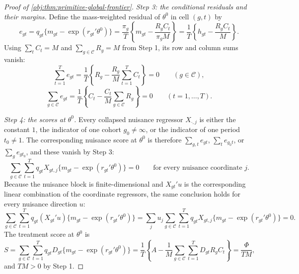 \documentclass[11pt]{article}
\begin{document}
\begin{proof}[Proof of \cref{obj:thm:primitive-global-frontier}]
\textit{Step 3: the conditional residuals and their margins.} Define the mass-weighted residual of \(\theta^0\) in cell \((g,t)\) by
\[
e_{gt}
=q_{gt}\{m_{gt}-\exp(r_{gt}'\theta^0)\}
=\frac{\pi_g}{T}\left\{m_{gt}-\frac{R_gC_t}{\pi_gM}\right\}
=\frac{1}{T}\left\{h_{gt}-\frac{R_gC_t}{M}\right\}.
\]
Using \(\sum_tC_t=M\) and \(\sum_{g\in\mathcal C}R_g=M\) from Step 1, its row and column sums vanish:
\[
\sum_{t=1}^T e_{gt}=\frac{1}{T}\left\{R_g-\frac{R_g}{M}\sum_{t=1}^TC_t\right\}=0
\qquad(g\in\mathcal C),
\]
\[
\sum_{g\in\mathcal C} e_{gt}=\frac{1}{T}\left\{C_t-\frac{C_t}{M}\sum_{g\in\mathcal C}R_g\right\}=0
\qquad(t=1,\ldots,T).
\]

\textit{Step 4: the scores at \(\theta^0\).} Every collapsed nuisance regressor \(X_{\cdot,j}\) is either the constant \(1\), the indicator of one cohort \(g_0\neq\infty\), or the indicator of one period \(t_0\neq1\). The corresponding nuisance score at \(\theta^0\) is therefore \(\sum_{g,t}e_{gt}\), \(\sum_te_{g_0t}\), or \(\sum_ge_{gt_0}\), and these vanish by Step 3:
\[
\sum_{g\in\mathcal C}\sum_{t=1}^T
q_{gt}X_{gt,j}\{m_{gt}-\exp(r_{gt}'\theta^0)\}=0
\qquad\text{for every nuisance coordinate }j .
\]
Because the nuisance block is finite-dimensional and \(X_{gt}'u\) is the corresponding linear combination of the coordinate regressors, the same conclusion holds for every nuisance direction \(u\):
\[
\sum_{g\in\mathcal C}\sum_{t=1}^T
q_{gt}(X_{gt}'u)\{m_{gt}-\exp(r_{gt}'\theta^0)\}
=
\sum_j u_j
\sum_{g\in\mathcal C}\sum_{t=1}^T
q_{gt}X_{gt,j}\{m_{gt}-\exp(r_{gt}'\theta^0)\}
=0 .
\]
The treatment score at \(\theta^0\) is
\[
S
=
\sum_{g\in\mathcal C}\sum_{t=1}^T
q_{gt}D_{gt}\{m_{gt}-\exp(r_{gt}'\theta^0)\}
=
\frac{1}{T}\left\{A-\frac{1}{M}\sum_{g\in\mathcal C}\sum_{t=1}^T D_{gt}R_gC_t\right\}
=
\frac{\Phi}{TM},
\]
and \(TM>0\) by Step 1.


\end{proof}
\end{document}
